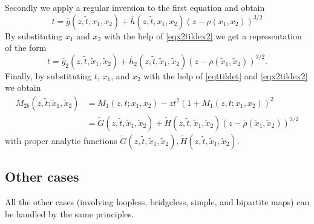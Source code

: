 \documentclass[a4paper,UKenglish,cleveref, autoref, thm-restate]{lipics-v2021}
\renewcommand{\(}{\left(}
\renewcommand{\)}{\right)}
\begin{document}
Secondly we apply a regular inversion to the first equation and obtain
\[
t = \overline g( z,\tilde t, x_1,x_2) + \overline h( z,\tilde t, x_1,x_2) (z- \rho(x_1,x_2))^{3/2}
\]
By substituting $x_1$  and $x_2$ with the 
help of \cref{eqx2tildex2} we get a representation of the form
\begin{equation}
\label{eqttildet}
t = \overline g_2( z,\tilde t, \tilde x_1,\tilde x_2) + \overline h_2( z,\tilde t, \tilde x_1, \tilde x_2) 
(z- \overline \rho(\tilde x_1, \tilde x_2))^{3/2}.    
\end{equation}
Finally, by substituting $t$, $x_1$, and $x_2$ with the help of
\cref{eqttildet} and \cref{eqx2tildex2} we obtain
\begin{align*}
M_{2b}(z,\tilde t; \tilde x_1,\tilde x_2) &= M_1(z,t;x_1,x_2) - zt^2 ( 1 + M_1(z,t;x_1,x_2))^2\\
&= \tilde G(z,\tilde t, \tilde x_1, \tilde x_2) +  \tilde H(z,\tilde t, \tilde x_1, \tilde x_2) 
(z- \overline \rho(\tilde x_1, \tilde x_2))^{3/2}
\end{align*}
with proper analytic functions $\tilde G(z,\tilde t, \tilde x_1, \tilde x_2), 
\tilde H(z,\tilde t, \tilde x_1, \tilde x_2)$.

\subsection{Other cases}

All the other cases (involving loopless, bridgeless, simple, and bipartite maps) 
can be handled by the same principles. 



\end{document}
